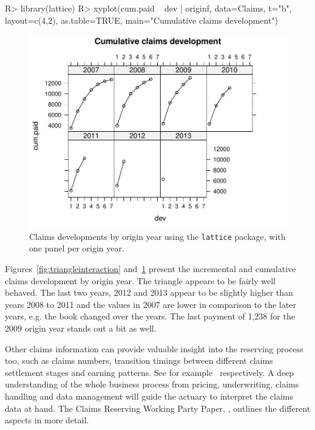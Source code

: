 \documentclass{article}
\begin{document}
\begin{Schunk}
\begin{Sinput}
R> library(lattice)
R> xyplot(cum.paid ~ dev | originf, data=Claims, t="b", layout=c(4,2),
          as.table=TRUE, main="Cumulative claims development")
\end{Sinput}
\end{Schunk}
\begin{figure}[thb]
  \begin{center}
\includegraphics{Log-incremental-triangleplotlattice}
\caption{Claims developments by origin year using the
  \texttt{lattice} package, with one panel per origin year.}
\label{fig:trianglelattice}
\end{center}
\end{figure}
Figures~\ref{fig:triangleinteraction} and~\ref{fig:trianglelattice}
present the incremental and cumulative claims development by origin
year. The triangle appears to be fairly well behaved. The last two years, 
2012 and 2013 appear to be slightly higher than years 2008 to 2011  and the
values in 2007 are lower in comparison to the later years, e.g. 
the book changed over the years. The last
payment of 1,238 for the 2009 origin year stands out a bit as well. 

Other claims information can provide valuable insight into the
reserving process too, such as claims numbers, transition timings between 
different claims settlement stages and earning patterns. See for
example~\cite{MariaDoloresMartinezMiranda2011, Orr2007, Murray2011} 
respectively. A deep understanding of the whole business process from pricing,
underwriting, claims handling and data management will guide the
actuary to interpret the claims data at hand. 
The Claims Reserving Working Party Paper, \cite{ClaimsReservingWorkingParty:2002},
outlines the different aspects in more detail.
\end{document}
